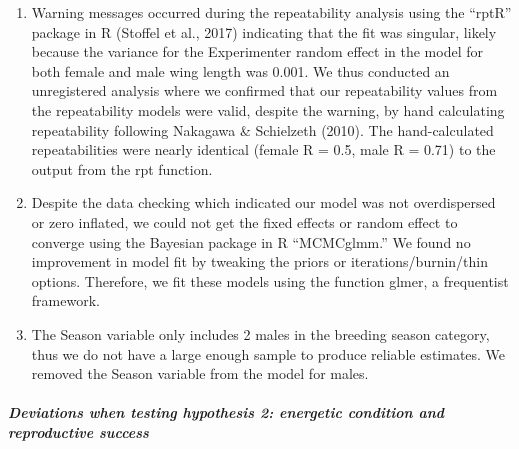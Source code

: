 \documentclass[
]{article}
\begin{document}
\begin{enumerate}
\def\labelenumi{\arabic{enumi})}
\setcounter{enumi}{2}
\item
  Warning messages occurred during the repeatability analysis using the
  ``rptR'' package in R (Stoffel et al., 2017) indicating that the fit
  was singular, likely because the variance for the Experimenter random
  effect in the model for both female and male wing length was 0.001. We
  thus conducted an unregistered analysis where we confirmed that our
  repeatability values from the repeatability models were valid, despite
  the warning, by hand calculating repeatability following Nakagawa \&
  Schielzeth (2010). The hand-calculated repeatabilities were nearly
  identical (female R = 0.5, male R = 0.71) to the output from the rpt
  function.
\item
  Despite the data checking which indicated our model was not
  overdispersed or zero inflated, we could not get the fixed effects or
  random effect to converge using the Bayesian package in R
  ``MCMCglmm.'' We found no improvement in model fit by tweaking the
  priors or iterations/burnin/thin options. Therefore, we fit these
  models using the function glmer, a frequentist framework.
\item
  The Season variable only includes 2 males in the breeding season
  category, thus we do not have a large enough sample to produce
  reliable estimates. We removed the Season variable from the model for
  males.
\end{enumerate}

\hypertarget{deviations-when-testing-hypothesis-2-energetic-condition-and-reproductive-success}{%
\subparagraph{Deviations when testing hypothesis 2: energetic condition
and reproductive
success}\label{deviations-when-testing-hypothesis-2-energetic-condition-and-reproductive-success}}
\end{document}

